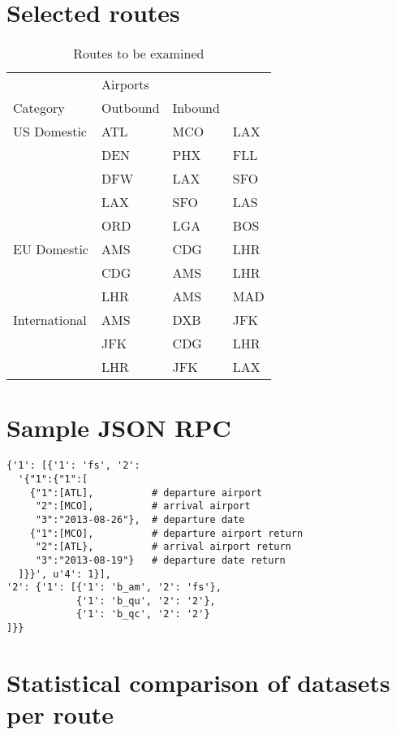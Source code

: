 \chapter{Selected routes}
\label{app:SelectedRoutes}
\begin{table}[h]
	\centering
    \begin{tabular}{ l l l l }
        \toprule
        ~           & Airports & ~ \\
        \cmidrule{2-4}
        Category        & Outbound & Inbound        \\
        \midrule
        US Domestic & ATL & MCO & LAX \\
        ~           & DEN & PHX & FLL \\
        ~           & DFW & LAX & SFO \\
        ~           & LAX & SFO & LAS \\
        ~           & ORD & LGA & BOS \\
        EU Domestic & AMS & CDG & LHR \\
		~           & CDG & AMS & LHR \\
		~           & LHR & AMS & MAD \\
        International & AMS & DXB & JFK \\
        ~             & JFK & CDG & LHR \\
        ~             & LHR & JFK & LAX \\
        \bottomrule
    \end{tabular}
	\caption{Routes to be examined}
\end{table}



\chapter{Sample JSON RPC}
\label{app:SampleJSONRPC}
\small
\begin{verbatim}
{'1': [{'1': 'fs', '2':
  '{"1":{"1":[
    {"1":[ATL],          # departure airport
     "2":[MCO],          # arrival airport
     "3":"2013-08-26"},  # departure date
    {"1":[MCO],          # departure airport return
     "2":[ATL},          # arrival airport return
     "3":"2013-08-19"}   # departure date return
  ]}}', u'4': 1}],
'2': {'1': [{'1': 'b_am', '2': 'fs'},
            {'1': 'b_qu', '2': '2'},
            {'1': 'b_qc', '2': '2'}
]}}
\end{verbatim}



\chapter{Statistical comparison of datasets per route}
\label{app:StatisticalComparisonDatasets}

